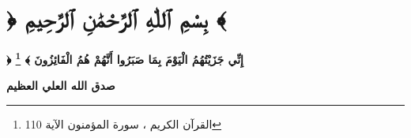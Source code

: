 \renewcommand{\thefootnote}{\fnsymbol{footnote}}

\chapter*{\amirifont ﴿ بِسْمِ ٱللّٰهِ ٱلرَّحْمَٰنِ ٱلرَّحِيمِ ﴾}
\thispagestyle{empty}
{\amirifont	\begin{center}\bfseries\huge
		﴿ إِنِّي جَزَيْتُهُمُ الْيَوْمَ بِمَا صَبَرُوا أَنَّهُمْ هُمُ الْفَائِزُونَ ﴾
		\footnote{ القرآن الكريم ، سورة المؤمنون الآية 110}
	\end{center}
	\hfill \textbf{صدق الله العلي العظيم}
}